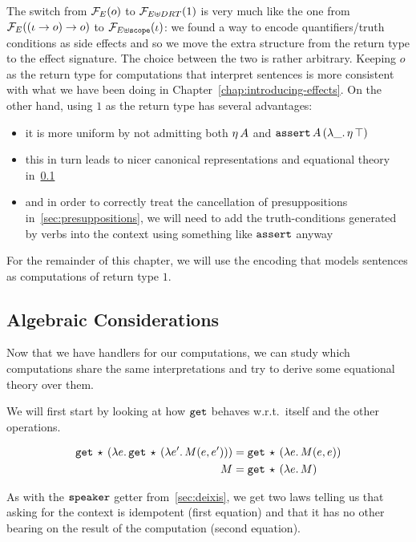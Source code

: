 The switch from $\mathcal{F}_E(o)$ to $\mathcal{F}_{E \uplus DRT}(1)$ is very much like the
one from $\mathcal{F}_E((\iota \to o) \to o)$ to
$\mathcal{F}_{E \uplus \mathtt{scope}}(\iota)$: we found a way to encode
quantifiers/truth conditions as side effects and so we move the extra
structure from the return type to the effect signature. The choice between
the two is rather arbitrary. Keeping $o$ as the return type for
computations that interpret sentences is more consistent with what we have
been doing in Chapter~\ref{chap:introducing-effects}. On the other hand,
using $1$ as the return type has several advantages:

\begin{itemize}
\item it is more uniform by not admitting both $\eta\,A$ and
  $\mathtt{assert}\,A\,(\lambda \_.\, \eta\,\top)$
\item this in turn leads to nicer canonical representations and equational
  theory in~\ref{ssec:algebraic-drt}
\item and in order to correctly treat the cancellation of presuppositions
  in~\ref{sec:presuppositions}, we will need to add the truth-conditions
  generated by verbs into the context using something like $\mathtt{assert}$
  anyway
\end{itemize}

For the remainder of this chapter, we will use the encoding that models
sentences as computations of return type $1$.


\subsection{Algebraic Considerations}
\label{ssec:algebraic-drt}

Now that we have handlers for our computations, we can study which
computations share the same interpretations and try to derive some
equational theory over them.

We will first start by looking at how $\mathtt{get}$ behaves w.r.t.\ itself and
the other operations.

\begin{align*}
   \mathtt{get}\,\star\,(\lambda e.\, \mathtt{get}\,\star\,(\lambda e'.\, M(e, e')))
&= \mathtt{get}\,\star\,(\lambda e.\, M(e, e)) \\
   M
&= \mathtt{get}\,\star\,(\lambda e.\, M)
\end{align*}

As with the $\mathtt{speaker}$ getter from~\ref{sec:deixis}, we get two laws
telling us that asking for the context is idempotent (first equation) and
that it has no other bearing on the result of the computation (second
equation).

